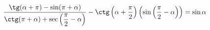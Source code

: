 \begin{ex}[type=prove_identity]
	\begin{condition}
		\( \dfrac{\tg(\alpha+\pi)-\sin(\pi+\alpha)}{\ctg(\pi+\alpha)+\sec\left( \dfrac{\pi}{2}-\alpha \right)}-\ctg\left( \alpha+\dfrac{\pi}{2} \right)\left( \sin\left( \dfrac{\pi}{2}-\alpha \right) \right)=\sin\alpha \)
	\end{condition}
\end{ex}